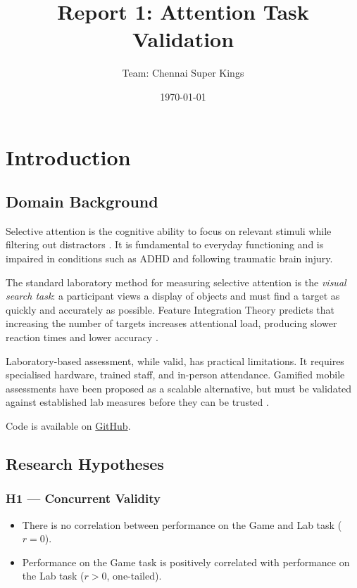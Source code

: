 \documentclass[12pt]{article}
\title{Report 1: Attention Task Validation}
\author{
Team: Chennai Super Kings \\
}
\date{\today}
\begin{document}
\maketitle
\tableofcontents


\section{Introduction}

\subsection{Domain Background}

Selective attention is the cognitive ability to focus on relevant stimuli
while filtering out distractors \citep{treisman1980feature}.
It is fundamental to everyday functioning and is impaired in conditions
such as ADHD and following traumatic brain injury.

The standard laboratory method for measuring selective attention is the
\emph{visual search task}: a participant views a display of objects and
must find a target as quickly and accurately as possible.
Feature Integration Theory predicts that increasing the number of targets
increases attentional load, producing slower reaction times and lower
accuracy \citep{treisman1980feature}.

Laboratory-based assessment, while valid, has practical limitations.
It requires specialised hardware, trained staff, and in-person attendance.
Gamified mobile assessments have been proposed as a scalable alternative,
but must be validated against established lab measures before they can
be trusted \citep{lumsden2016gamification}.

Code is available on \href{https://github.com/jewelj16/Attention-Task-Validation-Data-Analysis}{GitHub}.

\subsection{Research Hypotheses}

\subsubsection*{H1 --- Concurrent Validity}
\begin{itemize}
  \item[$H_0$:] There is no correlation between performance on the Game and Lab task ($r = 0$).
  \item[$H_1$:] Performance on the Game task is positively correlated with performance on the Lab task ($r > 0$, one-tailed).
\end{itemize}
\end{document}
